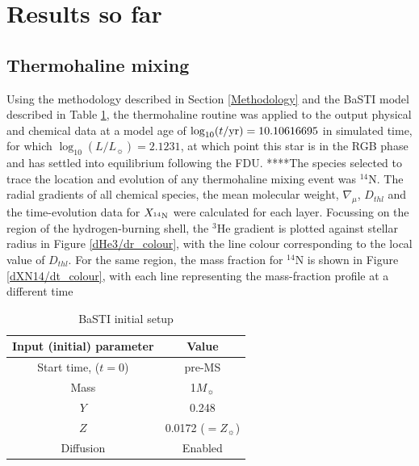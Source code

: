 \documentclass[usenatbib]{mnras}
\begin{document}
\section{Results so far}
\subsection{Thermohaline mixing}
Using the methodology described in Section \ref{Methodology} and the BaSTI model described in Table \ref{basti_params}, the thermohaline routine was applied to the output physical and chemical data at a model age of $\log_{10}(t/\textnormal{yr}) = 10.10616695$ in simulated time, for which $\log_{10}(L/L_{\sun}) = 2.1231$, at which point this star is in the RGB phase and has settled into equilibrium following the FDU. ****The species selected to trace the location and evolution of any thermohaline mixing event was $^{14}$N. The radial gradients of all chemical species, the mean molecular weight, $\nabla_{\mu}$,  $D_{thl}$ and the time-evolution data for $X_{^{14}\textnormal{N}}$ were calculated for each layer. Focussing on the region of the hydrogen-burning shell, the $^{3}$He gradient is plotted against stellar radius in Figure \ref{dHe3/dr_colour}, with the line colour corresponding to the local value of $D_{thl}$. For the same region, the mass fraction for $^{14}$N is shown in Figure \ref{dXN14/dt_colour}, with each line representing the mass-fraction profile at a different time

\begin{table}
\begin{tabular}{cc}
\hline
Input (initial) parameter & Value \\
\hline
Start time, ($t=0$) & pre-MS \\
Mass & 1$M_{\sun}$ \\
$Y$ & 0.248 \\
$Z$ & 0.0172 ($=Z_{\sun}$) \\
Diffusion & Enabled \\
\hline
\end{tabular}
\caption{BaSTI initial setup}
\label{basti_params}
\end{table}
\end{document}
